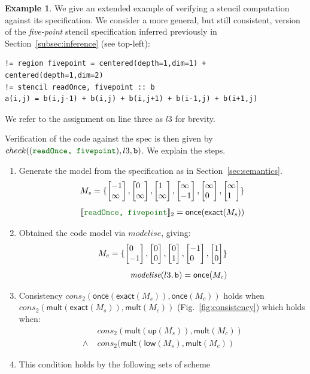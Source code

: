\documentclass[9pt]{sigplanconf}
\newcounter{block}
\theoremstyle{definition}
\newtheorem{example}[block]{Example}
\newcommand{\interp}[1]{\llbracket{#1}\rrbracket}
\newcommand{\vtwo}[2]{\setlength{\arraycolsep}{0em}
\left[\begin{array}{l}#1\\#2\end{array}\right]}
\begin{document}
\begin{example}
We give an extended example of verifying a stencil computation against
its specification. We consider a more general, but still consistent, version of the \textit{five-point}
stencil specification inferred previously in
Section~\ref{subsec:inference} (see top-left):
%
\begin{verbatim}
!= region fivepoint = centered(depth=1,dim=1) + centered(depth=1,dim=2)
!= stencil readOnce, fivepoint :: b
a(i,j) = b(i,j-1) + b(i,j) + b(i,j+1) + b(i-1,j) + b(i+1,j)
\end{verbatim}
%
We refer to the assignment on line three as $l3$ for brevity.

Verification of the code against the spec is then given by 
$check(({\textcolor{darkgreen}{\texttt{readOnce, fivepoint}}}),l3,\texttt{b})$. 
We explain the steps.
\begin{enumerate}  
%
\item Generate the model from the specification as in
  Section~\ref{sec:semantics}. 
%
\begin{align*}
 M_s= \{  \vtwo{-1}{\infty},
          \vtwo{0}{\infty},
          \vtwo{1}{\infty},
          \vtwo{\infty}{-1},
          \vtwo{\infty}{0},
        \vtwo{\infty}{1} \}  \\[0.4em]
\interp{{\textcolor{darkgreen}{\texttt{readOnce, fivepoint}}}}_2 =
  \textsf{once}(\textsf{exact} (M_s))
\end{align*}
%
\item Obtained the code model via $\textit{modelise}$, giving:
%
\begin{align*}
M_c = \{
    \vtwo{0}{-1},
    \vtwo{0}{0},
    \vtwo{0}{1},
    \vtwo{-1}{0},
    \vtwo{1}{0}
  \}
\\[0.4em]
\textit{modelise}(l3, \texttt{b}) = \textsf{once} (M_c)
\end{align*}
%
\item Consistency $cons_2(\textsf{once}(\textsf{exact}(M_s)),
  \textsf{once}(M_c))$ holds when 
  $\textit{cons}_2(\textsf{mult}(\textsf{exact}(M_s)),\textsf{mult}(M_c))$ (Fig.~\ref{fig:consistency}) 
  which holds when: 
  \begin{align*}
     & \textit{cons}_2(\textsf{mult}(\textsf{up}(M_s)),\textsf{mult}(M_c)) \\
   \wedge \; & \textit{cons}_2(\textsf{mult}(\textsf{low}(M_s),\textsf{mult}(M_c))
  \end{align*}
%
\item This condition holds by the following sets of scheme

\end{enumerate}
\end{example}
\end{document}
